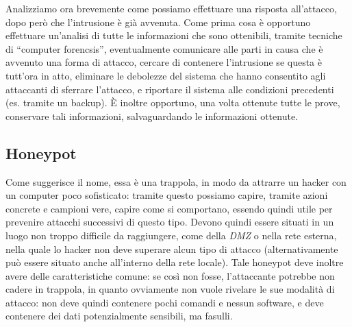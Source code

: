 Analizziamo ora brevemente come possiamo effettuare una risposta all'attacco,
dopo però che l'intrusione è già avvenuta. Come prima cosa è opportuno effettuare
un'analisi di tutte le informazioni che sono ottenibili, tramite tecniche di
``computer forencsis'', eventualmente comunicare alle parti in causa che è
avvenuto una forma di attacco, cercare di contenere l'intrusione se questa è
tutt'ora in atto, eliminare le debolezze del sistema che hanno consentito agli
attaccanti di sferrare l'attacco, e riportare il sistema alle condizioni 
precedenti (es. tramite un backup). È inoltre opportuno, una volta ottenute
tutte le prove, conservare tali informazioni, salvaguardando le informazioni
ottenute. 

\subsection{Honeypot}
Come suggerisce il nome, essa è una trappola, in modo da attrarre un hacker
con un computer poco sofisticato: tramite questo possiamo capire, tramite 
azioni concrete e campioni vere, capire come si comportano, essendo quindi
utile per prevenire attacchi successivi di questo tipo. Devono quindi essere
situati in un luogo non troppo difficile da raggiungere, come della \textit{DMZ}
o nella rete esterna, nella quale lo hacker non deve superare alcun tipo di
attacco (alternativamente può essere situato anche all'interno della rete
locale). Tale honeypot deve inoltre avere delle caratteristiche comune: se 
così non fosse, l'attaccante potrebbe non cadere in trappola, in quanto ovviamente
non vuole rivelare le sue modalità di attacco: non deve quindi contenere pochi
comandi e nessun software, e deve contenere dei dati potenzialmente sensibili,
ma fasulli.
